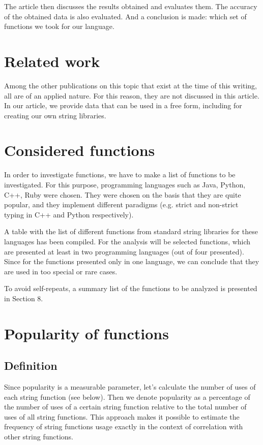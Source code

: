 \documentclass[anonymous,sigplan,review,11pt,nonacm,natbib=false]{acmart}
\begin{document}
    The article then discusses the results obtained and evaluates them. The accuracy of the obtained data is also evaluated. And a conclusion is made: which set of functions we took for our language.

    \section{Related work}

    Among the other publications on this topic that exist at the time of this writing, all are of an applied nature. For this reason, they are not discussed in this article. In our article, we provide data that can be used in a free form, including for creating our own string libraries.

    \section{Considered functions}

    In order to investigate functions, we have to make a list of functions to be investigated. For this purpose, programming languages such as Java, Python, C++, Ruby were chosen. They were chosen on the basis that they are quite popular, and they implement different paradigms (e.g. strict and non-strict typing in C++ and Python respectively).

    A table with the list of different functions from standard string libraries for these languages has been compiled. For the analysis will be selected functions, which are presented at least in two programming languages (out of four presented). Since for the functions presented only in one language, we can conclude that they are used in too special or rare cases.

    To avoid self-repeats, a summary list of the functions to be analyzed is presented in Section 8.

    \section{Popularity of functions}

    \subsection{Definition}

    Since popularity is a measurable parameter, let's calculate the number of uses of each string function (see below). Then we denote popularity as a percentage of the number of uses of a certain string function relative to the total number of uses of all string functions. This approach makes it possible to estimate the frequency of string functions usage exactly in the context of correlation with other string functions.
\end{document}
